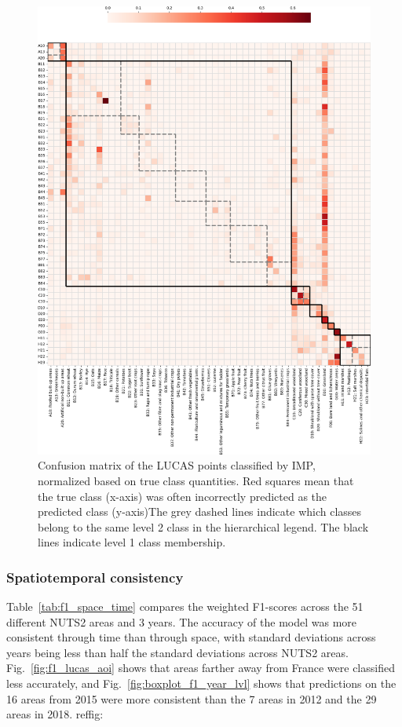     \begin{figure}[H]
        \centering
        \includegraphics[width=\textwidth]{figs_05/fig_hierarchical_confusion_matrix_lucas.png}
        \caption{Confusion matrix of the LUCAS points classified by IMP, normalized based on true class quantities. Red squares mean that the true class (x-axis) was often incorrectly predicted as the predicted class (y-axis)The grey dashed lines indicate which classes belong to the same level 2 class in the hierarchical legend. The black lines indicate level 1 class membership.}
        \label{fig:05_confusion_matrix_lucas}
    \end{figure}

    \subsubsection{Spatiotemporal consistency}

        Table\@~\ref{tab:f1_space_time} compares the weighted F1-scores across the 51 different NUTS2 areas and 3 years. The accuracy of the model was more consistent through time than through space, with standard deviations across years being less than half the standard deviations across NUTS2 areas. Fig.\@~\ref{fig:f1_lucas_aoi} shows that areas farther away from France were classified less accurately, and Fig.\@~\ref{fig:boxplot_f1_year_lvl} shows that predictions on the 16 areas from 2015 were more consistent than the 7 areas in 2012 and the 29 areas in 2018.
        ref{fig:}

